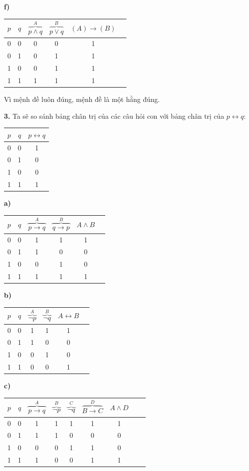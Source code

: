 \documentclass[12pt,a4paper]{article}
\theoremstyle{definition}
\begin{document}
\medskip
\textbf{f)}
\begin{center}
\begin{tabular}{cc|cccc}
$p$ & $q$ & $\overbrace{p \land q}^{A}$ & $\overbrace{p \lor q}^{B}$ & $(A) \to (B)$ \\
\hline
0 & 0 & 0 & 0 & 1 \\
0 & 1 & 0 & 1 & 1 \\
1 & 0 & 0 & 1 & 1 \\
1 & 1 & 1 & 1 & 1
\end{tabular}
\end{center}
Vì mệnh đề luôn đúng, mệnh đề là một hằng đúng.

\bigskip
\textbf{3.} Ta sẽ so sánh bảng chân trị của các câu hỏi con với bảng chân trị của $p \leftrightarrow q$:

\begin{center}
\begin{tabular}{cc|c}
$p$ & $q$ & $p \leftrightarrow q$ \\
\hline
0 & 0 & 1 \\
0 & 1 & 0 \\
1 & 0 & 0 \\
1 & 1 & 1
\end{tabular}
\end{center}

\textbf{a)}
\begin{center}
\begin{tabular}{cc|cccc}
$p$ & $q$ & $\overbrace{p \to q}^{A}$ & $\overbrace{q \to p}^{B}$ & $A \land B$ \\
\hline
0 & 0 & 1 & 1 & 1 \\
0 & 1 & 1 & 0 & 0 \\
1 & 0 & 0 & 1 & 0 \\
1 & 1 & 1 & 1 & 1
\end{tabular}
\end{center}

\textbf{b)}
\begin{center}
\begin{tabular}{cc|cccc}
$p$ & $q$ & $\overbrace{\neg p}^{A}$ & $\overbrace{\neg q}^{B}$ & $A \leftrightarrow B$ \\
\hline
0 & 0 & 1 & 1 & 1 \\
0 & 1 & 1 & 0 & 0 \\
1 & 0 & 0 & 1 & 0 \\
1 & 1 & 0 & 0 & 1
\end{tabular}
\end{center}

\textbf{c)}
\begin{center}
\begin{tabular}{cc|ccccccc}
$p$ & $q$ & $\overbrace{p \to q}^{A}$ & $\overbrace{\neg p}^{B}$ & $\overbrace{\neg q}^{C}$ & $\overbrace{B \to C}^{D}$ & $A \land D$ \\
\hline
0 & 0 & 1 & 1 & 1 & 1 & 1 \\
0 & 1 & 1 & 1 & 0 & 0 & 0 \\
1 & 0 & 0 & 0 & 1 & 1 & 0 \\
1 & 1 & 1 & 0 & 0 & 1 & 1
\end{tabular}
\end{center}
\end{document}
